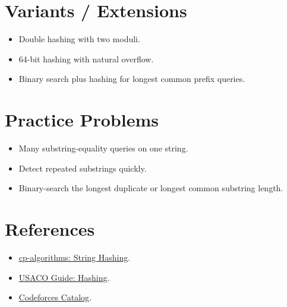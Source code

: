 \section*{Variants / Extensions}

\begin{itemize}
  \item Double hashing with two moduli.
  \item 64-bit hashing with natural overflow.
  \item Binary search plus hashing for longest common prefix queries.
\end{itemize}

\section*{Practice Problems}

\begin{itemize}
  \item Many substring-equality queries on one string.
  \item Detect repeated substrings quickly.
  \item Binary-search the longest duplicate or longest common substring length.
\end{itemize}

\section*{References}

\begin{itemize}
  \item \href{https://cp-algorithms.com/string/string-hashing.html}{cp-algorithms: String Hashing}.
  \item \href{https://usaco.guide/gold/hashing?lang=cpp}{USACO Guide: Hashing}.
  \item \href{https://codeforces.com/catalog}{Codeforces Catalog}.
\end{itemize}
